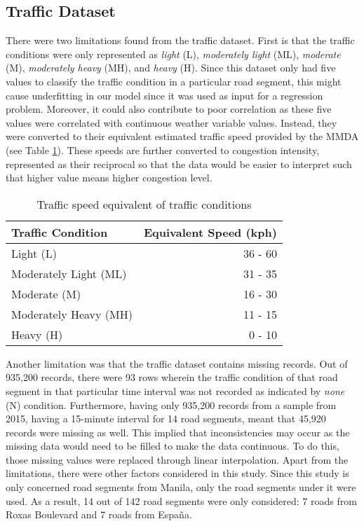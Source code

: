 \subsection{Traffic Dataset}
There were two limitations found from the traffic dataset. First is that the traffic conditions were only represented as \textit{light} (L), \textit{moderately light} (ML), \textit{moderate} (M), \textit{moderately heavy} (MH), and \textit{heavy} (H). Since this dataset only had five values to classify the traffic condition in a particular road segment, this might cause underfitting in our model since it was used as input for a regression problem. Moreover, it could also contribute to poor correlation as these five values were correlated with continuous weather variable values. Instead, they were converted to their equivalent estimated traffic speed provided by the MMDA (see Table \ref{table_traffic_condition}). These speeds are further converted to congestion intensity, represented as their reciprocal so that the data would be easier to interpret such that higher value means higher congestion level.


\begin{table}[h]
\centering
\caption{Traffic speed equivalent of traffic conditions}
\label{table_traffic_condition}
\begin{tabular}{|l|r|}
\hline
\textbf{Traffic Condition} & \multicolumn{1}{l|}{\textbf{Equivalent Speed (kph)}} \\ \hline
Light (L) & 36 - 60 \\ \hline
Moderately Light (ML) & 31 - 35 \\ \hline
Moderate (M) & 16 - 30 \\ \hline
Moderately Heavy (MH) & 11 - 15 \\ \hline
Heavy (H) & 0 - 10 \\ \hline
\end{tabular}
\end{table}

Another limitation was that the traffic dataset contains missing records. Out of 935,200 records, there were 93 rows wherein the traffic condition of that road segment in that particular time interval was not recorded as indicated by \textit{none} (N) condition. Furthermore, having only 935,200 records from a sample from 2015, having a 15-minute interval for 14 road segments, meant that 45,920 records were missing as well. This implied that inconsistencies may occur as the missing data would need to be filled to make the data continuous. To do this, those missing values were replaced through linear interpolation. 
Apart from the limitations, there were other factors considered in this study. Since this study is only concerned road segments from Manila, only the road segments under it were used. As a result, 14 out of 142 road segments were only considered: 7 roads from Roxas Boulevard and 7 roads from España.


